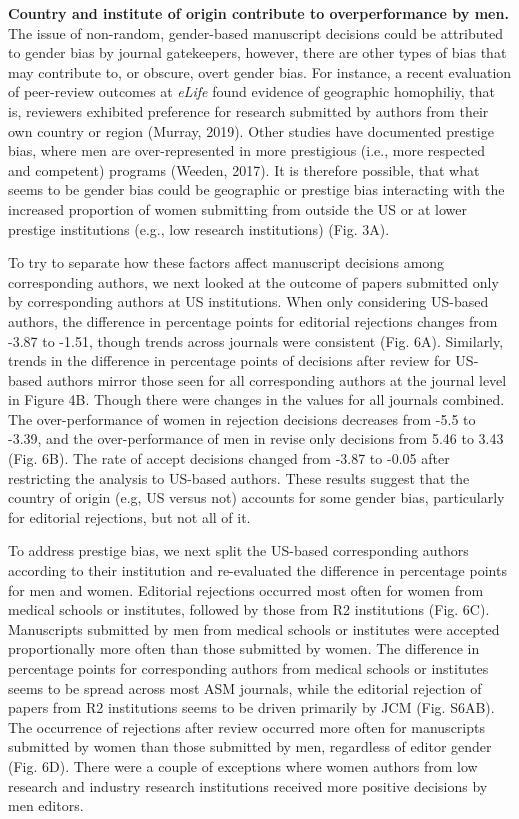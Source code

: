\documentclass[11pt,]{article}
\begin{document}
\textbf{Country and institute of origin contribute to overperformance by
men.} The issue of non-random, gender-based manuscript decisions could
be attributed to gender bias by journal gatekeepers, however, there are
other types of bias that may contribute to, or obscure, overt gender
bias. For instance, a recent evaluation of peer-review outcomes at
\emph{eLife} found evidence of geographic homophiliy, that is, reviewers
exhibited preference for research submitted by authors from their own
country or region (Murray, 2019). Other studies have documented prestige
bias, where men are over-represented in more prestigious (i.e., more
respected and competent) programs (Weeden, 2017). It is therefore
possible, that what seems to be gender bias could be geographic or
prestige bias interacting with the increased proportion of women
submitting from outside the US or at lower prestige institutions (e.g.,
low research institutions) (Fig. 3A).

To try to separate how these factors affect manuscript decisions among
corresponding authors, we next looked at the outcome of papers submitted
only by corresponding authors at US institutions. When only considering
US-based authors, the difference in percentage points for editorial
rejections changes from -3.87 to -1.51, though trends across journals
were consistent (Fig. 6A). Similarly, trends in the difference in
percentage points of decisions after review for US-based authors mirror
those seen for all corresponding authors at the journal level in Figure
4B. Though there were changes in the values for all journals combined.
The over-performance of women in rejection decisions decreases from -5.5
to -3.39, and the over-performance of men in revise only decisions from
5.46 to 3.43 (Fig. 6B). The rate of accept decisions changed from -3.87
to -0.05 after restricting the analysis to US-based authors. These
results suggest that the country of origin (e.g, US versus not) accounts
for some gender bias, particularly for editorial rejections, but not all
of it.

To address prestige bias, we next split the US-based corresponding
authors according to their institution and re-evaluated the difference
in percentage points for men and women. Editorial rejections occurred
most often for women from medical schools or institutes, followed by
those from R2 institutions (Fig. 6C). Manuscripts submitted by men from
medical schools or institutes were accepted proportionally more often
than those submitted by women. The difference in percentage points for
corresponding authors from medical schools or institutes seems to be
spread across most ASM journals, while the editorial rejection of papers
from R2 institutions seems to be driven primarily by JCM (Fig. S6AB).
The occurrence of rejections after review occurred more often for
manuscripts submitted by women than those submitted by men, regardless
of editor gender (Fig. 6D). There were a couple of exceptions where
women authors from low research and industry research institutions
received more positive decisions by men editors.
\end{document}
